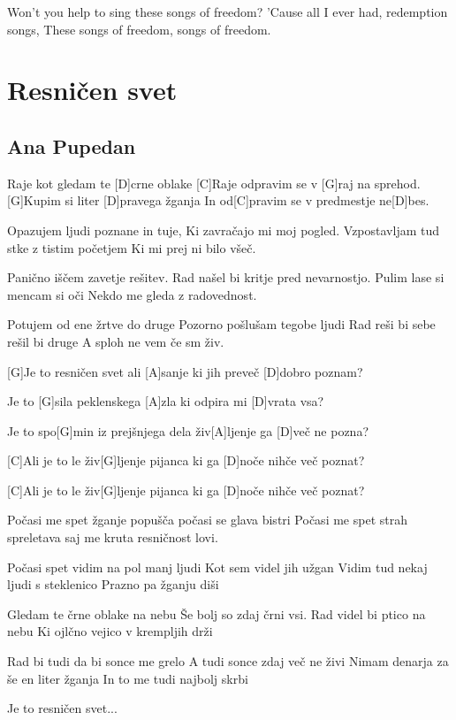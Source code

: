 \documentclass[a4paper,12pt]{article}
\begin{document}
\begin{multicols}{2}
\begin{guitar}
Won't you help to sing 
these songs of freedom?
'Cause all I ever had, redemption songs,
These songs of freedom, songs of freedom.



\end{guitar}
\section{Resničen svet}
\subsection*{Ana Pupedan}
\begin{guitar}
[G]Raje kot gledam te [D]crne oblake
[C]Raje odpravim se v [G]raj na sprehod.
[G]Kupim si liter [D]pravega žganja
In od[C]pravim se v predmestje ne[D]bes.


Opazujem ljudi poznane in tuje,
Ki zavračajo mi moj pogled.
Vzpostavljam tud stke z tistim početjem
Ki mi prej ni bilo všeč.


Panično iščem zavetje rešitev.
Rad našel bi kritje pred nevarnostjo.
Pulim lase si mencam si oči
Nekdo me gleda z radovednost.


Potujem od ene žrtve do druge
Pozorno pošlušam tegobe ljudi
Rad reši bi sebe rešil bi druge
A sploh ne vem če sm živ.


[G]Je to resničen svet ali [A]sanje 
ki jih preveč [D]dobro poznam?


Je to [G]sila peklenskega [A]zla 
ki odpira mi [D]vrata vsa?


Je to spo[G]min iz prejšnjega dela 
živ[A]ljenje ga [D]več ne pozna?


[C]Ali je to le živ[G]ljenje pijanca 
ki ga [D]noče nihče več poznat?


[C]Ali je to le živ[G]ljenje pijanca 
ki ga [D]noče nihče več poznat?


Počasi me spet žganje popušča
počasi se glava bistri
Počasi me spet strah spreletava
saj me kruta resničnost lovi.


Počasi spet vidim na pol manj ljudi
Kot sem videl jih užgan
Vidim tud nekaj ljudi s steklenico
Prazno pa žganju diši


Gledam te črne oblake na nebu
Še bolj so zdaj črni vsi.
Rad videl bi ptico na nebu
Ki ojlčno vejico v krempljih drži


Rad bi tudi da bi sonce me grelo
A tudi sonce zdaj več ne živi
Nimam denarja za še en liter žganja
In to me tudi najbolj skrbi


Je to resničen svet...


\end{guitar}
\end{multicols}
\end{document}
